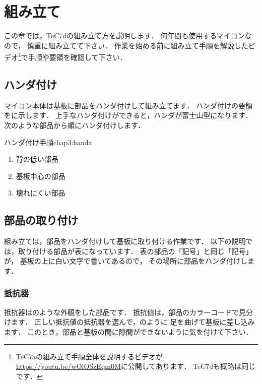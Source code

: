 \chapter{組み立て\label{kumitate}}
この章では，TeC7dの組み立て方を説明します．
何年間も使用するマイコンなので，
慎重に組み立てて下さい．
作業を始める前に組み立て手順を解説したビデオ\footnote{
  \begin{minipage}[t]{0.9\columnwidth}
    \begin{minipage}{0.75\columnwidth}
      TeC7aの組み立て手順全体を説明するビデオが
      \url{https://youtu.be/wOlOSzEqm0M}に公開してあります．
      TeC7dも概略は同じです．
    \end{minipage}\hfill
    \begin{minipage}{0.2\columnwidth}
    \end{minipage}
  \end{minipage}
}で手順や要領を確認して下さい．

\section{ハンダ付け}
マイコン本体は基板に部品をハンダ付けして組み立てます．
ハンダ付けの要領をに示します．
上手なハンダ付けができると，ハンダが富士山型になります．
次のような部品から順にハンダ付けします．

          {ハンダ付け手順}{chap3:handa}

\begin{enumerate}
\item 背の低い部品
\item 基板中心の部品
\item 壊れにくい部品
\end{enumerate}

\section{部品の取り付け}
組み立ては，部品をハンダ付けして基板に取り付ける作業です．
以下の説明では，取り付ける部品が表になっています．
表の部品の「記号」と同じ「記号」が，
基板の上に白い文字で書いてあるので，
その場所に部品をハンダ付けします．

\subsection{抵抗器}
抵抗器はのような外観をした部品です．
抵抗値は，部品のカラーコードで見分けます．
正しい抵抗値の抵抗器を選んで，のように
足を曲げて基板に差し込みます．
このとき，部品と基板の間に隙間ができないように気を付けて下さい．

